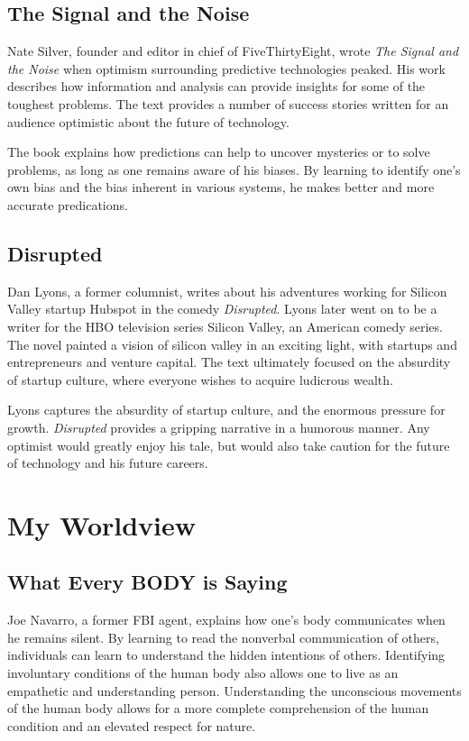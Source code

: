 \documentclass{article}
\begin{document}
\subsection{The Signal and the Noise}
Nate Silver, founder and editor in chief of FiveThirtyEight, wrote \textit{The Signal and the Noise} when optimism surrounding predictive technologies peaked. His work describes how information and analysis can provide insights for some of the toughest problems. The text provides a number of success stories written for an audience optimistic about the future of technology. 

The book explains how predictions can help to uncover mysteries or to solve problems, as long as one remains aware of his biases. By learning to identify one's own bias and the bias inherent in various systems, he makes better and more accurate predications. 

\subsection{Disrupted}
Dan Lyons, a former columnist, writes about his adventures working for Silicon Valley startup Hubspot in the comedy \textit{Disrupted}. Lyons later went on to be a writer for the HBO television series Silicon Valley, an American comedy series. The novel painted a vision of silicon valley in an exciting light, with startups and entrepreneurs and venture capital. The text ultimately focused on the absurdity of startup culture, where everyone wishes to acquire ludicrous wealth. 

Lyons captures the absurdity of startup culture, and the enormous pressure for growth. \textit{Disrupted} provides a gripping narrative in a humorous manner. Any optimist would greatly enjoy his tale, but would also take caution for the future of technology and his future careers. 

\section{My Worldview}
\subsection{What Every BODY is Saying}
Joe Navarro, a former FBI agent, explains how one's body communicates when he remains silent. By learning to read the nonverbal communication of others, individuals can learn to understand the hidden intentions of others. Identifying involuntary conditions of the human body also allows one to live as an empathetic and understanding person. Understanding the unconscious movements of the human body allows for a more complete comprehension of the human condition and an elevated respect for nature. 
\end{document}
